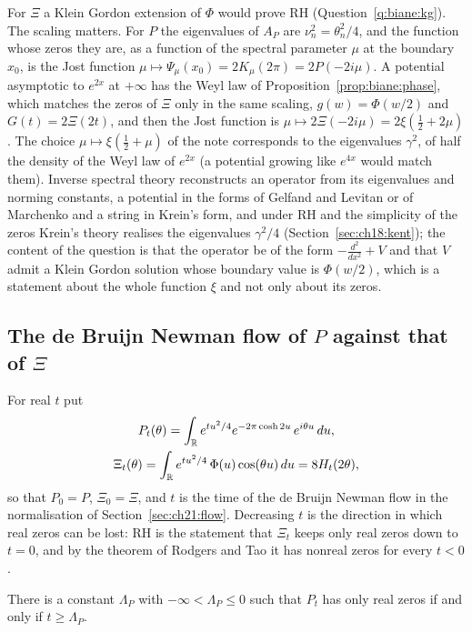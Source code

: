 For $\Xi$ a Klein Gordon extension of $\Phi$ would prove RH (Question~\ref{q:biane:kg}). The scaling matters. For $P$ the eigenvalues of $A_P$ are $\nu_n^2=\theta_n^2/4$, and the function whose zeros they are, as a function of the spectral parameter $\mu$ at the boundary $x_0$, is the Jost function $\mu\mapsto\Psi_\mu(x_0)=2K_\mu(2\pi)=2P(-2i\mu)$. A potential asymptotic to $e^{2x}$ at $+\infty$ has the Weyl law of Proposition~\ref{prop:biane:phase}, which matches the zeros of $\Xi$ only in the same scaling, $g(w)=\Phi(w/2)$ and $G(t)=2\Xi(2t)$, and then the Jost function is $\mu\mapsto2\Xi(-2i\mu)=2\xi(\frac12+2\mu)$. The choice $\mu\mapsto\xi(\frac12+\mu)$ of the note \cite{P26bia} corresponds to the eigenvalues $\gamma^2$, of half the density of the Weyl law of $e^{2x}$ (a potential growing like $e^{4x}$ would match them). Inverse spectral theory reconstructs an operator from its eigenvalues and norming constants, a potential in the forms of Gelfand and Levitan or of Marchenko and a string in Krein's form, and under RH and the simplicity of the zeros Krein's theory realises the eigenvalues $\gamma^2/4$ (Section~\ref{sec:ch18:kent}); the content of the question is that the operator be of the form $-\frac{d^2}{dx^2}+V$ and that $V$ admit a Klein Gordon solution whose boundary value is $\Phi(w/2)$, which is a statement about the whole function $\xi$ and not only about its zeros.

\subsection{The de Bruijn Newman flow of \texorpdfstring{$P$}{P} against that of \texorpdfstring{$\Xi$}{Xi}}\label{sec:biane:flow}

For real $t$ put
\begin{gather*}
P_t(\theta)=\int_{\mathbb{R}}e^{tu^2/4}e^{-2\pi\cosh2u}\,e^{i\theta u}\,du,\\
\Xi_t(\theta)=\int_{\mathbb{R}}e^{tu^2/4}\,\Phi(u)\cos(\theta u)\,du=8H_t(2\theta),
\end{gather*}
so that $P_0=P$, $\Xi_0=\Xi$, and $t$ is the time of the de Bruijn Newman flow in the normalisation of Section~\ref{sec:ch21:flow}. Decreasing $t$ is the direction in which real zeros can be lost: RH is the statement that $\Xi_t$ keeps only real zeros down to $t=0$, and by the theorem of Rodgers and Tao \cite{RodgersTao} it has nonreal zeros for every $t<0$.

\begin{proposition}\label{prop:biane:lambdaP}
There is a constant $\Lambda_P$ with $-\infty<\Lambda_P\le0$ such that $P_t$ has only real zeros if and only if $t\ge\Lambda_P$.
\end{proposition}

